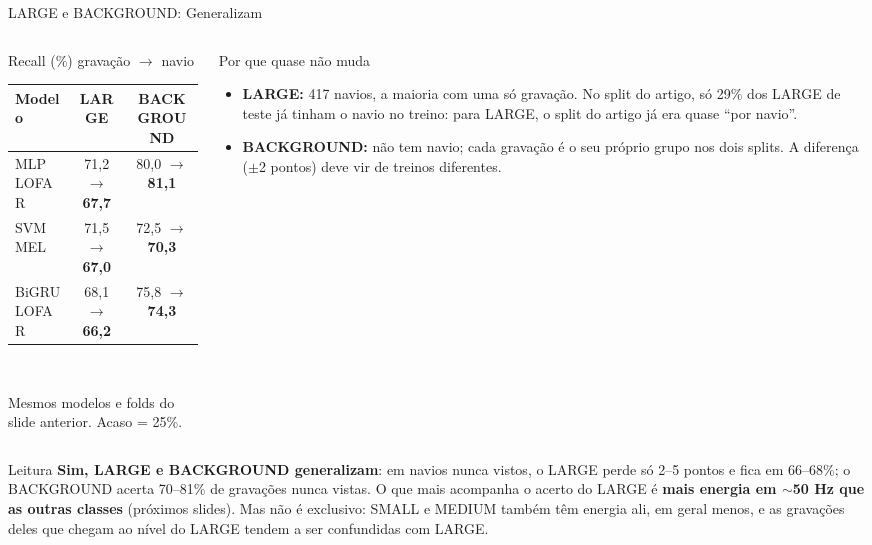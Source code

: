 \documentclass[aspectratio=169]{beamer}
\newcommand{\cahi}[1]{\cellcolor{green!30}\textbf{#1}}
\begin{document}
\begin{frame}{LARGE e BACKGROUND: Generalizam}
    \footnotesize
    \begin{columns}[T]
        \begin{column}{0.50\textwidth}
            \begin{block}{\small Recall (\%) gravação $\to$ navio}
                \scriptsize
                \centering
                \setlength{\tabcolsep}{4pt}
                \begin{tabular}{lcc}
                \toprule
                Modelo & LARGE & BACKGROUND \\
                \midrule
                MLP LOFAR & 71,2 $\to$ \cahi{67,7} & 80,0 $\to$ \cahi{81,1} \\
                SVM MEL & 71,5 $\to$ \cahi{67,0} & 72,5 $\to$ \cahi{70,3} \\
                BiGRU LOFAR & 68,1 $\to$ \cahi{66,2} & 75,8 $\to$ \cahi{74,3} \\
                \bottomrule
                \end{tabular}\\[3pt]
                {\tiny Mesmos modelos e folds do slide anterior. Acaso = 25\%.\par}
            \end{block}
        \end{column}
        \begin{column}{0.48\textwidth}
            \begin{block}{\small Por que quase não muda}
                \scriptsize
                \begin{itemize}
                    \setlength{\itemsep}{2pt}
                    \item \textbf{LARGE:} 417 navios, a maioria com uma só gravação. No split do artigo, só 29\% dos LARGE de teste já tinham o navio no treino: para LARGE, o split do artigo já era quase ``por navio''.
                    \item \textbf{BACKGROUND:} não tem navio; cada gravação é o seu próprio grupo nos dois splits. A diferença ($\pm$2 pontos) deve vir de treinos diferentes.
                \end{itemize}
            \end{block}
        \end{column}
    \end{columns}
    \vspace{0.1cm}
    \begin{alertblock}{Leitura}
        \scriptsize
        \textbf{Sim, LARGE e BACKGROUND generalizam}: em navios nunca vistos, o LARGE perde só 2--5 pontos e fica em 66--68\%; o BACKGROUND acerta 70--81\% de gravações nunca vistas. O que mais acompanha o acerto do LARGE é \textbf{mais energia em $\sim$50 Hz que as outras classes} (próximos slides). Mas não é exclusivo: SMALL e MEDIUM também têm energia ali, em geral menos, e as gravações deles que chegam ao nível do LARGE tendem a ser confundidas com LARGE.
    \end{alertblock}
\end{frame}
\end{document}
